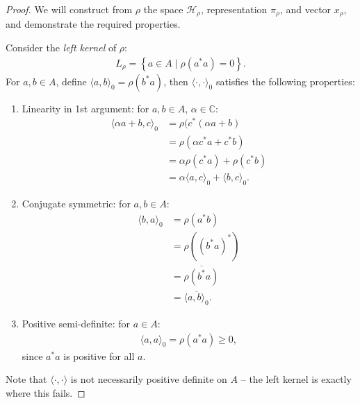 \documentclass[11pt,a4paper]{report}
\theoremstyle{plain}
\theoremstyle{definition}
\newcommand{\1}{\mathbbm{1}}
\newcommand{\Hr}{\mathcal{H}_\rho}
\begin{document}
\begin{proof}
	We will construct from $\rho$ the space $\Hr$, representation $\pi_\rho$, and 
	vector $x_\rho$, and demonstrate the required properties.
	
	Consider the \emph{left kernel} of $\rho$:
	\begin{align*}
		L_\rho = \left\{a \in A \mid \rho (a ^\ast a) = 0 \right\}.
	\end{align*}	
	For $a,b \in A$, define $\langle a , b \rangle_0 = \rho(b^\ast a)$, then 
	$\langle \cdot, \cdot \rangle_0$ satisfies the following properties:
	\begin{enumerate}
	  \item Linearity in 1st argument: for $a,b\in A$, $\alpha \in \mathbb{C}$:
		\begin{align*}
		   \langle \alpha a +  b, c \rangle_0 
		&= \rho (c^\ast(\alpha a +  b)   												\\
		&= \rho (\alpha c^\ast a +  c^\ast b)  											\\
		&= \alpha \rho (c^\ast a) +  \rho (c^\ast b)									\\
		&= \alpha \langle a , c \rangle_0 +  \langle b, c \rangle_0.
		\end{align*}
	  \item Conjugate symmetric: for $a,b \in A$:
	  	\begin{align*}
	  	   \langle b,a \rangle _0 
	  	&= \rho (a^\ast b)																\\
	  	&= \rho ((b^\ast a)^\ast)														\\
	  	&= \overline{\rho (b^\ast a)}													\\
	  	&= \overline{\langle a,b \rangle _0 }.
	  	\end{align*}
	  \item Positive semi-definite: for $a \in A$:
	  	\begin{align*}
	  		\langle a,a\rangle_0 = \rho(a^\ast a) \geq 0,
	  	\end{align*}
	  	since $a^\ast a$ is positive for all $a$.
	\end{enumerate}
	Note that $\langle \cdot, \cdot \rangle$ is not necessarily positive definite on 
	$A$ -- the left kernel is exactly where this fails.
	

\end{proof}
\end{document}
